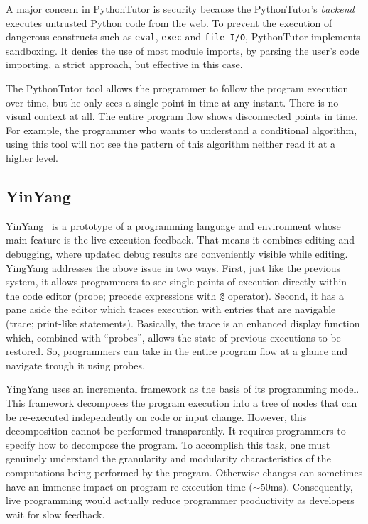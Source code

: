 A major concern in PythonTutor is security because the PythonTutor's \textit{backend} executes untrusted Python code from the web. To prevent the execution of dangerous constructs such as {\tt eval}, {\tt exec} and {\tt file I/O}, PythonTutor implements sandboxing. It denies the use of most module imports, by parsing the user's code importing, a strict approach, but effective in this case.

The PythonTutor tool allows the programmer to follow the program execution over time, but he only sees a single point in time at any instant. There is no visual context at all. The entire program flow shows disconnected points in time. For example, the programmer who wants to understand a conditional algorithm, using this tool will not see the pattern of this algorithm neither read it at a higher level.
\subsection{YinYang}
\label{subsec:yinyang}
YinYang~\citep{mcdirmid2013usable} is a prototype of a programming language and environment whose main feature is the live execution feedback. That means it combines editing and debugging, where updated debug results are conveniently visible while editing. YingYang addresses the above issue in two ways. First, just like the previous system, it allows programmers to see single points of execution directly within the code editor (probe; precede expressions with \texttt{@} operator). Second, it has a pane aside the editor which traces execution with entries that are navigable (trace; print-like statements). Basically, the trace is an enhanced display function which, combined with ``probes'', allows the state of previous executions to be restored. So, programmers can take in the entire program flow at a glance and navigate trough it using probes.

YingYang uses an incremental framework as the basis of its programming model. This framework decomposes the program execution into a tree of nodes that can be re-executed independently on code or input change. However, this decomposition cannot be performed transparently. It requires programmers to specify how to decompose the program. To accomplish this task, one must genuinely understand the granularity and modularity characteristics of the computations being performed by the program. Otherwise changes can sometimes have an immense impact on program re-execution time ($\sim$50ms). Consequently, live programming would actually reduce programmer productivity as developers wait for slow feedback.

